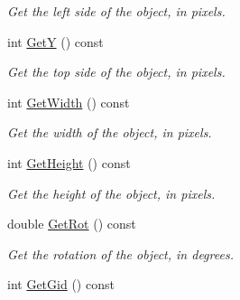\begin{DoxyCompactItemize}
\begin{DoxyCompactList}\small\item\em Get the left side of the object, in pixels. \end{DoxyCompactList}\item 
\hypertarget{classTmx_1_1Object_af4417421feb6732d973e2aa0771f9b1e}{int \hyperlink{classTmx_1_1Object_af4417421feb6732d973e2aa0771f9b1e}{Get\-Y} () const }\label{classTmx_1_1Object_af4417421feb6732d973e2aa0771f9b1e}

\begin{DoxyCompactList}\small\item\em Get the top side of the object, in pixels. \end{DoxyCompactList}\item 
\hypertarget{classTmx_1_1Object_a5f34e674147cd764e874e0f59c3427fc}{int \hyperlink{classTmx_1_1Object_a5f34e674147cd764e874e0f59c3427fc}{Get\-Width} () const }\label{classTmx_1_1Object_a5f34e674147cd764e874e0f59c3427fc}

\begin{DoxyCompactList}\small\item\em Get the width of the object, in pixels. \end{DoxyCompactList}\item 
\hypertarget{classTmx_1_1Object_a8f38dc66b0a7c9144282e7dc9c099e40}{int \hyperlink{classTmx_1_1Object_a8f38dc66b0a7c9144282e7dc9c099e40}{Get\-Height} () const }\label{classTmx_1_1Object_a8f38dc66b0a7c9144282e7dc9c099e40}

\begin{DoxyCompactList}\small\item\em Get the height of the object, in pixels. \end{DoxyCompactList}\item 
\hypertarget{classTmx_1_1Object_a0e5a5162ea26004949d39da9d83eef21}{double \hyperlink{classTmx_1_1Object_a0e5a5162ea26004949d39da9d83eef21}{Get\-Rot} () const }\label{classTmx_1_1Object_a0e5a5162ea26004949d39da9d83eef21}

\begin{DoxyCompactList}\small\item\em Get the rotation of the object, in degrees. \end{DoxyCompactList}\item 
\hypertarget{classTmx_1_1Object_a64cada0c2d4e313764803a870bd3cdcc}{int \hyperlink{classTmx_1_1Object_a64cada0c2d4e313764803a870bd3cdcc}{Get\-Gid} () const }\label{classTmx_1_1Object_a64cada0c2d4e313764803a870bd3cdcc}


\end{DoxyCompactItemize}
